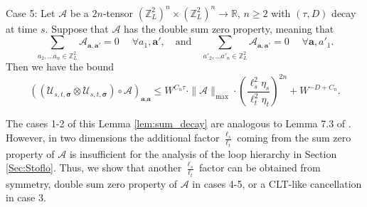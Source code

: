 \begin{lemma}
Case 5: Let $\mathcal{A}$ be a $2n$-tensor $\left(\mathbb{Z}^2_L\right)^{n} \times \left(\mathbb{Z}^2_L\right)^{n} \rightarrow \mathbb{R}$, $n\ge 2$ with $(\tau, D)$ decay at time $s$. Suppose that $\mathcal{A}$ has the double sum zero property, meaning that
\begin{equation*}
    \sum_{a_2, \ldots a_n \in \mathbb{Z}_L^2} \mathcal{A}_{\textbf{a}, \textbf{a}'} = 0\; \quad \forall a_1,\textbf{a}', \quad\text{and}\quad  \sum_{a'_2, \ldots a'_n \in \mathbb{Z}_L^2} \mathcal{A}_{\textbf{a}, \textbf{a}'} = 0\; \quad \forall \textbf{a}, a'_1.
\end{equation*}
Then we have the bound
\begin{equation}\label{eq:double_sum_zero_tensor}
    \left(\left(\mathcal{U}_{s,t,\boldsymbol{\sigma}}\otimes \mathcal{U}_{s,t,\boldsymbol{\bar{\sigma}}}\right) \circ \mathcal{A}\right)_{\textbf{a},\textbf{a}} \le W^{C_n\tau}\cdot   \|\mathcal{A}\|_{\max} 
    \cdot \left(\frac{\ell_s^2\eta_s}{\ell_t^2\eta_t}\right)^{2n} +W^{-D+C_n}.
\end{equation}

\end{lemma} 

The cases 1-2 of this Lemma \ref{lem:sum_decay} are analogous to Lemma 7.3 of \cite{YY_25}. However, in two dimensions the additional factor $\frac{\ell_s}{\ell_t}$ coming from the sum zero property of $\mathcal{A}$ is insufficient for the analysis of the loop hierarchy in Section \ref{Sec:Stoflo}. Thus, we show that another $\frac{\ell_s}{\ell_t}$ factor can be obtained from symmetry, double sum zero property of $\mathcal{A}$ in cases 4-5, or a CLT-like cancellation in case 3.

